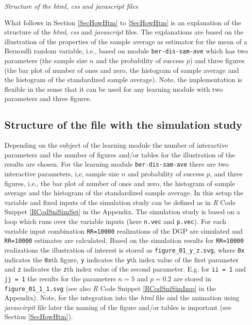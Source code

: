 \documentclass[12pt]{article}
\begin{document}
\vspace{1em}
\noindent\emph{Structure of the \emph{html}, \emph{css} and \emph{javascript} files}

What follows in Section \ref{SecHowHtm} to \ref{SecHowHtm} is an explanation of the structure of the \emph{html}, \emph{css} and \emph{javascript} files.  
%
The explanations are based on the illustration of the properties of the sample average as estimator for the mean of a Bernoulli random variable, i.e., based on module \texttt{ber-dis-sam-ave} which has two parameters (the sample size $n$ and the probability of success $p$) and three figures (the bar plot of number of ones and zero, the histogram of sample average and the histogram of the standardized sample average). 
%
Note, the implementation is flexible in the sense that it can be used for any learning module with two parameters and three figures. 

\subsection{Structure of the file with the simulation study}\label{SecHowSim}


Depending on the subject of the learning module the number of interactive parameters and the number of figures and/or tables for the illustration of the results are chosen. 
%
For the learning module \texttt{ber-dis-sam-ave} there are two interactive parameters, i,e, sample size $n$ and probability of success $p$, and three figures, i.e., the bar plot of number of ones and zero, the histogram of sample average and the histogram of the standardized sample average. 
%
In this setup the variable and fixed inputs of the simulation study can be defined as in \emph{R} Code Snippet \ref{RCodSniSimSet} in the Appendix. 
%
The simulation study is based on a loop which runs over the variable inputs (here \texttt{n.vec} and \texttt{p.vec}). 
%
For each variable input combination \texttt{RR=10000} realizations of the DGP are simulated and \texttt{RR=10000} estimates are calculated. 
%
Based on the simulation results for \texttt{RR=10000} realizations the illustration of interest is stored as \texttt{figure\_01\_y\_z.svg}, where \texttt{0x} indicates the \texttt{0x}th figure, \texttt{y} indicates the \texttt{y}th index value of the first parameter and \texttt{z} indicates the \texttt{z}th index value of the second parameter. 
%
E.g. for \texttt{ii =  1} and \texttt{jj = 1} the results for the parameters $n=5$ and $p=0.2$ are stored in \texttt{figure\_01\_1\_1.svg} (see also \emph{R} Code Snippet \ref{RCodSniSimImp} in the Appendix).%
%
Note, for the integration into the \emph{html} file and the animation using \emph{javascirpit} file later the naming of the figure and/or tables is important (see Section \ref{SecHowHtm}).
\end{document}
